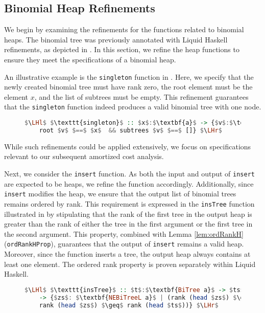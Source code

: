 \documentclass{clmthesis}
\begin{document}
\subsection{Binomial Heap Refinements}
We begin by examining the refinements for the functions related to binomial heaps. The binomial tree was previously annotated with Liquid Haskell refinements, as depicted in . In this section, we refine the heap functions to ensure they meet the specifications of a binomial heap.

An illustrative example is the \texttt{singleton} function in . Here, we specify that the newly created binomial tree must have rank zero, the root element must be the element $x$, and the list of subtrees must be empty. This refinement guarantees that the \texttt{singleton} function indeed produces a valid binomial tree with one node.
\begin{figure}[h]
\begin{lstlisting}[mathescape=true, language=haskell, caption={Liquid Type of \texttt{singleton}.},captionpos=b, label=fig:singl]
$\LHl$ $\texttt{singleton}$ :: $x$:$\textbf{a}$ -> {$v$:$\textbf{BiTree a}$ | rank $v$ $==$ 0 && 
	root $v$ $==$ $x$  && subtrees $v$ $==$ []} $\LHr$
\end{lstlisting}
\end{figure}
While such refinements could be applied extensively, we focus on specifications relevant to our subsequent amortized cost analysis.

Next, we consider the \texttt{insert} function. As both the input and output of \texttt{insert} are expected to be heaps, we refine the function accordingly. Additionally, since \texttt{insert} modifies the heap, we ensure that the output list of binomial trees remains ordered by rank. This requirement is expressed in the \texttt{insTree} function illustrated in  by stipulating that the rank of the first tree in the output heap is greater than the rank of either the tree in the first argument or the first tree in the second argument. This property, combined with Lemma \ref{lem:ordRankH} (\texttt{ordRankHProp}), guarantees that the output of \texttt{insert} remains a valid heap. Moreover, since the function inserts a tree, the output heap always contains at least one element. The ordered rank property is proven separately within Liquid Haskell.

\begin{figure}[h]
\begin{lstlisting}[mathescape=true, language=haskell, caption={Liquid Type of \texttt{insTree}.},captionpos=b, label=fig:liquidinsTree]
$\LHl$ $\texttt{insTree}$ :: $t$:$\textbf{BiTree a}$ -> $ts$:$\textbf{BiHeap a}$ 	
	-> {$zs$: $\textbf{NEBiTreeL a}$ | (rank (head $zs$) $\geq$ rank $t$ || 
	rank (head $zs$) $\geq$ rank (head $ts$))} $\LHr$
\end{lstlisting}
\end{figure}
\end{document}
